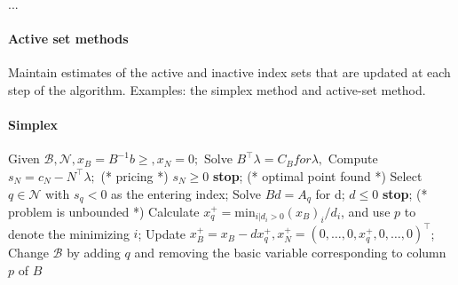 
...

\sepline

\paragraph{Active set methods} Maintain estimates of the active and inactive index sets
that are updated at each step of the algorithm. Examples: the simplex method and active-set method.

\paragraph{Simplex}

\begin{codebox}
\li Given $\mathcal{B}, \mathcal{N}, x_B = B^{-1}b \geq, x_N = 0;$
\li Solve $B^\top \lambda = C_B for \lambda,$
\li Compute $s_N = c_N - N^\top \lambda;$ (* pricing *)
\li \If $s_N \geq 0$ \Indentmore
\li \textbf{stop}; (* optimal point found *) \End
\li Select $q \in \mathcal{N}$ with $s_q < 0$ as the entering index;
\li Solve $Bd = A_q$ for d;
\li \If $d \leq 0$ \Indentmore
\li \textbf{stop}; (* problem is unbounded *) \End
\li Calculate $x_q^+ = \text{min}_{i | d_i > 0} (x_B)_i/d_i$, and use $p$ to
\zi denote the minimizing $i$;
\li Update $x_B^+ = x_B - dx_q^+, x_N^+ = (0, \dots, 0, x_q^+, 0, \dots, 0)^\top$;
\li Change $\mathcal{B}$ by adding $q$ and removing the basic
\zi variable corresponding to column $p$ of $B$
\end{codebox}
